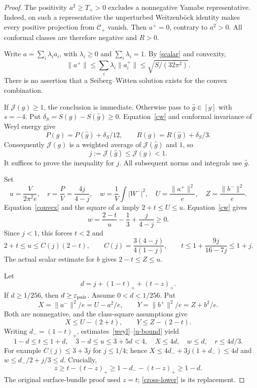 \documentclass[11pt,a4paper]{article}
\theoremstyle{definition}\newtheorem{assumption}[theorem]{Input}
\theoremstyle{remark}\newtheorem{remark}[theorem]{Remark}
\newcommand{\cJ}{\mathcal J}
\numberwithin{equation}{section}
\begin{document}
\begin{proof}
The positivity $a^2\ge T_+>0$ excludes a nonnegative Yamabe representative. Indeed, on such a representative the unperturbed Weitzenb\"ock identity makes every positive projection from $\mathcal C_+$ vanish. Then $a^+=0$, contrary to $a^2>0$. All conformal classes are therefore negative and $R>0$.

Write $a=\sum_i\lambda_i a_i$, with $\lambda_i\ge0$ and $\sum_i\lambda_i=1$. By \eqref{scalar} and convexity,
\begin{equation}\label{convex}
 \|a^+\|\le\sum_i\lambda_i\|a_i^+\|\le\sqrt{S/(32\pi^2)}.
\end{equation}
There is no assertion that a Seiberg--Witten solution exists for the convex combination.

If $\cJ(g)\ge1$, the conclusion is immediate. Otherwise pass to $\widehat g\in[g]$ with $s=-4$. Put $\delta_S=S(g)-S(\widehat g)\ge0$. Equation~\eqref{cw} and conformal invariance of Weyl energy give
\[
 P(g)=P(\widehat g)+\delta_S/12,\qquad
 R(g)=R(\widehat g)+\delta_S/3.
\]
Consequently $\cJ(g)$ is a weighted average of $\cJ(\widehat g)$ and $1$, so
\[
 j:=\cJ(\widehat g)\le\cJ(g)<1.
\]
It suffices to prove the inequality for $j$. All subsequent norms and integrals use $\widehat g$.

Set
\[
 u=\frac{V}{2\pi^2e},\quad r=\frac PV=\frac{4j}{4-j},\quad
 w=\frac1V\int|W^-|^2,\quad U=\frac{\|a^+\|^2}{e},\quad
 Z=\frac{\|b^-\|^2}{e}.
\]
Equation~\eqref{convex} and the square of $a$ imply $2+t\le U\le u$. Equation~\eqref{cw} gives
\begin{equation}\label{weyl}
 w=\frac{2-t}{u}-\frac13+\frac{j}{4-j}\ge0.
\end{equation}
Since $j<1$, this forces $t<2$ and
\begin{equation}\label{u-bound}
 2+t\le u\le C(j)(2-t),\qquad C(j)=\frac{3(4-j)}{4(1-j)},
 \qquad t\le1+\frac{9j}{16-7j}\le1+j.
\end{equation}
The actual scalar estimate for $b$ gives $2-t\le Z\le u$.

Let
\[
 d=j+(1-t)_++(t-z)_+.
\]
If $d\ge1/256$, then $d\ge\varepsilon_{\rm pair}$. Assume $0<d<1/256$. Put
\[
 X=\|a^-\|^2/e=U-a^2/e,\qquad
 Y=\|b^+\|^2/e=Z+b^2/e.
\]
Both are nonnegative, and the class-square assumptions give
\[
 X\le U-(2+t),\qquad Y\le Z-(2-t).
\]
Writing $d_-=(1-t)_+$, estimates~\eqref{weyl}--\eqref{u-bound} yield
\begin{equation}\label{small}
 1-d\le t\le1+d,\quad 3-d\le u\le3+5d<4,\quad
 X\le4d,\quad w\le d,\quad r\le4d/3.
\end{equation}
For example $C(j)\le3+3j$ for $j\le1/4$; hence
$X\le4d_-+3j(1+d_-)\le4d$ and
$w\le d_-/2+j/3\le d$.
Crucially,
\begin{equation}\label{cross-lower}
 z\ge t-(t-z)_+\ge1-d_--(t-z)_+\ge1-d.
\end{equation}
The original surface-bundle proof used $z=t$; \eqref{cross-lower} is its replacement.


\end{proof}
\end{document}

